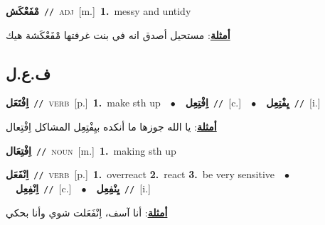 \documentclass[10pt,a4paper,twoside]{article} %
\begin{document}
\begin{multicols}{2}
{\setlength\topsep{0pt}\textbf{\foreignlanguage{arabic}{مْفَعْكَش}}\ {\color{gray}\texttt{//}\color{black}}\ \textsc{adj}\ [m.]\ \textbf{1.}~messy and untidy\  \begin{flushright}\color{gray}\foreignlanguage{arabic}{\textbf{\underline{\foreignlanguage{arabic}{أمثلة}}}: مستحيل أصدق انه في بنت غرفتها مْفَعْكَشة هيك}\end{flushright}\color{black}} \vspace{2mm}

\vspace{-3mm}
\subsection*{\color{blue}\foreignlanguage{arabic}{ف.ع.ل}\color{blue}{}} 

{\setlength\topsep{0pt}\textbf{\foreignlanguage{arabic}{اِفْتَعَل}}\ {\color{gray}\texttt{//}\color{black}}\ \textsc{verb}\ [p.]\ \textbf{1.}~make sth up\ \ $\bullet$\ \ \setlength\topsep{0pt}\textbf{\foreignlanguage{arabic}{اِفْتِعِل}}\ {\color{gray}\texttt{//}\color{black}}\ [c.]\ \ $\bullet$\ \ \setlength\topsep{0pt}\textbf{\foreignlanguage{arabic}{يِفْتِعِل}}\ {\color{gray}\texttt{//}\color{black}}\ [i.]\  \begin{flushright}\color{gray}\foreignlanguage{arabic}{\textbf{\underline{\foreignlanguage{arabic}{أمثلة}}}: يا الله جوزها ما أنكده بيِفْتِعِل المشاكل اِفْتِعال}\end{flushright}\color{black}} \vspace{2mm}

{\setlength\topsep{0pt}\textbf{\foreignlanguage{arabic}{اِفْتِعَال}}\ {\color{gray}\texttt{//}\color{black}}\ \textsc{noun}\ [m.]\ \textbf{1.}~making sth up\ } \vspace{2mm}

{\setlength\topsep{0pt}\textbf{\foreignlanguage{arabic}{اِنْفَعَل}}\ {\color{gray}\texttt{//}\color{black}}\ \textsc{verb}\ [p.]\ \textbf{1.}~overreact  \textbf{2.}~react  \textbf{3.}~be very sensitive\ \ $\bullet$\ \ \setlength\topsep{0pt}\textbf{\foreignlanguage{arabic}{اِنْفِعِل}}\ {\color{gray}\texttt{//}\color{black}}\ [c.]\ \ $\bullet$\ \ \setlength\topsep{0pt}\textbf{\foreignlanguage{arabic}{يِنْفِعِل}}\ {\color{gray}\texttt{//}\color{black}}\ [i.]\  \begin{flushright}\color{gray}\foreignlanguage{arabic}{\textbf{\underline{\foreignlanguage{arabic}{أمثلة}}}: أنا آسف، اِنْفَعَلت شوي وأنا بحكي}\end{flushright}\color{black}} \vspace{2mm}


\end{multicols}
\end{document}
